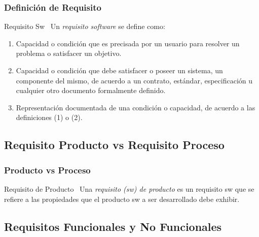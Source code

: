 \documentclass[a4paper,slidestop,xcolor=pst,dvips,blue]{beamer}
\begin{document}
\begin{frame}
    \frametitle{Definición de Requisito}
    \begin{block}{Requisito Sw~\cite{ieee:seGlossary}}
        Un \alert{\emph{requisito software}} se define como:
        \begin{enumerate}
            \item<2-> Capacidad o condición que es precisada por un usuario para resolver un problema o satisfacer un objetivo.
            \item<3-> Capacidad o condición que debe satisfacer o poseer un sistema, un componente del mismo, de acuerdo a un contrato, estándar, especificación u cualquier otro documento formalmente definido.
            \item<4-> Representación documentada de una condición o capacidad, de acuerdo a las definiciones (1) o (2).
        \end{enumerate}
    \end{block}
\end{frame}

\subsection{Requisito Producto vs Requisito Proceso}

\begin{frame}
    \frametitle{Producto vs Proceso}
    \begin{block}{Requisito de Producto~\cite{ieee:swebok}}
            Una \alert{\emph{requisito (sw) de producto}} es un requisito sw que se refiere a las propiedades que el producto sw a ser desarrollado debe exhibir.
    \end{block}
\end{frame}

\subsection{Requisitos Funcionales y No Funcionales}
\end{document}
